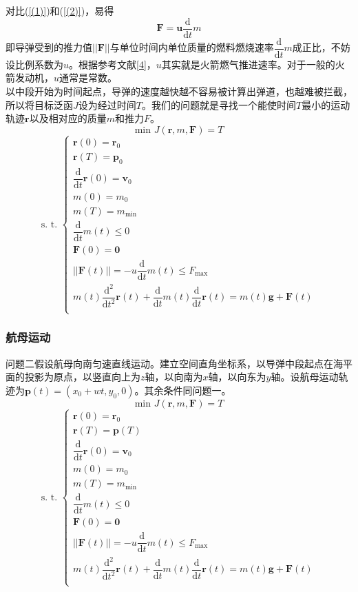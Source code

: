 \documentclass[UTF8]{article}
\begin{document}
\indent 对比(\ref{(1)})和(\ref{(2)})，易得
\begin{equation}
\textbf{F}=\textbf{u}\dfrac{\textrm{d}}{\textrm{d}t}m\label{(3)}
\end{equation}
\indent 即导弹受到的推力值\(||\textbf{F}||\)与单位时间内单位质量的燃料燃烧速率\(\dfrac{\textrm{d}}{\textrm{d}t}m\)成正比，不妨设比例系数为\(u\)。根据参考文献\ref{4}，\(u\)其实就是火箭燃气推进速率。对于一般的火箭发动机，\(u\)通常是常数。\\
\indent 以中段开始为时间起点，导弹的速度越快越不容易被计算出弹道，也越难被拦截，所以将目标泛函\(J\)设为经过时间\(T\)。我们的问题就是寻找一个能使时间\(T\)最小的运动轨迹\(\textbf{r}\)以及相对应的质量\(m\)和推力\(F\)。
\begin{equation}
\textrm{min }J(\textbf{r},m,\textbf{F})=T\label{(4)}
\end{equation}
\[\textrm{s. t. }\left\{
\begin{array}{l}
\textbf{r}(0)=\textbf{r}_0\\
\textbf{r}(T)=\textbf{p}_0\\
\dfrac{\textrm{d}}{\textrm{d}t}\textbf{r}(0)=\textbf{v}_0\\
m(0)=m_0\\
m(T)=m_\textrm{min}\\
\dfrac{\textrm{d}}{\textrm{d}t}m(t)\leqslant 0\\
\textbf{F}(0)=\textbf{0}\\
||\textbf{F}(t)||=-u\dfrac{\textrm{d}}{\textrm{d}t}m(t)\leqslant F_{\textrm{max}}\\
m(t)\dfrac{\textrm{d}^2}{\textrm{d}t^2}\textbf{r}(t)+\dfrac{\textrm{d}}{\textrm{d}t}m(t)\dfrac{\textrm{d}}{\textrm{d}t}\textbf{r}(t)=m(t)\textbf{g}+\textbf{F}(t)\\
\end{array}\right. \]

\subsubsection{航母运动}
问题二假设航母向南匀速直线运动。建立空间直角坐标系，以导弹中段起点在海平面的投影为原点，以竖直向上为\(z\)轴，以向南为\(x\)轴，以向东为\(y\)轴。设航母运动轨迹为\(\textbf{p}(t)=(x_0+wt,y_0,0)\)。其余条件同问题一。
\[\textrm{min }J(\textbf{r},m,\textbf{F})=T\]
\[\textrm{s. t. }\left\{
\begin{array}{l}
\textbf{r}(0)=\textbf{r}_0\\
\textbf{r}(T)=\textbf{p}(T)\\
\dfrac{\textrm{d}}{\textrm{d}t}\textbf{r}(0)=\textbf{v}_0\\
m(0)=m_0\\
m(T)=m_\textrm{min}\\
\dfrac{\textrm{d}}{\textrm{d}t}m(t)\leqslant 0\\
\textbf{F}(0)=\textbf{0}\\
||\textbf{F}(t)||=-u\dfrac{\textrm{d}}{\textrm{d}t}m(t)\leqslant F_{\textrm{max}}\\
m(t)\dfrac{\textrm{d}^2}{\textrm{d}t^2}\textbf{r}(t)+\dfrac{\textrm{d}}{\textrm{d}t}m(t)\dfrac{\textrm{d}}{\textrm{d}t}\textbf{r}(t)=m(t)\textbf{g}+\textbf{F}(t)\\
\end{array}\right. \]
\end{document}
